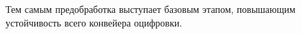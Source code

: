 Тем самым предобработка выступает базовым этапом, повышающим устойчивость всего конвейера оцифровки.
